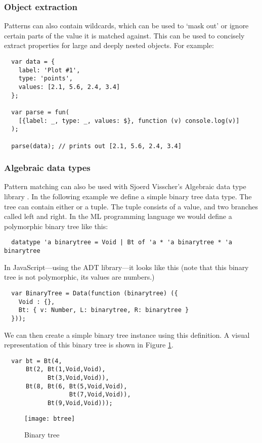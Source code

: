 \subsubsection{Object extraction}
Patterns can also contain wildcards, which can be used to ‘mask out’ or ignore certain parts of the value it is matched against. This can be used to concisely extract properties for large and deeply nested objects. For example:
\begin{verbatim}
  var data = {
    label: 'Plot #1',
    type: 'points',
    values: [2.1, 5.6, 2.4, 3.4]
  };

  var parse = fun(
    [{label: _, type: _, values: $}, function (v) console.log(v)]
  );

  parse(data); // prints out [2.1, 5.6, 2.4, 3.4]
\end{verbatim}
\subsubsection{Algebraic data types}
Pattern matching can also be used with Sjoerd Visscher's Algebraic data type library \cite{visser08}. In the following example we define a simple binary tree data type. The tree can contain either  or a  tuple. The tuple consists of a value, and two branches called left and right. In the ML programming language we would define a polymorphic binary tree like this:
\begin{verbatim}
  datatype 'a binarytree = Void | Bt of 'a * 'a binarytree * 'a binarytree
\end{verbatim}
In JavaScript---using the ADT library---it looks like this (note that this binary tree is not polymorphic, its values are numbers.)
\begin{verbatim}
  var BinaryTree = Data(function (binarytree) ({
    Void : {},
    Bt: { v: Number, L: binarytree, R: binarytree }
  }));
\end{verbatim}
We can then create a simple binary tree instance using this definition. A visual representation of this binary tree is shown in Figure \ref{btree}. 
\begin{verbatim}
  var bt = Bt(4, 
      Bt(2, Bt(1,Void,Void), 
            Bt(3,Void,Void)), 
      Bt(8, Bt(6, Bt(5,Void,Void), 
                  Bt(7,Void,Void)), 
            Bt(9,Void,Void)));
\end{verbatim}

\begin{figure}[h!]
\centering
\texttt{[image: btree]}
\caption{Binary tree}
\label{btree}
\end{figure}

